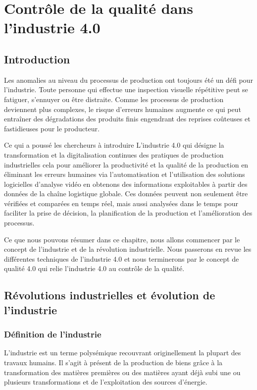 \chapter{Contrôle de la qualité dans l’industrie 4.0}
\section{Introduction}
Les anomalies au niveau du processus de production ont toujours été un défi pour l’industrie. Toute personne qui effectue une inspection visuelle répétitive peut se fatiguer, s'ennuyer ou être distraite. Comme les processus de production deviennent plus complexes, le risque d'erreurs humaines augmente ce qui peut entraîner des dégradations des produits finis engendrant des reprises coûteuses et fastidieuses pour le producteur. 

Ce qui a poussé les chercheurs à introduire L'industrie 4.0 qui désigne la transformation et la digitalisation continues des pratiques de production industrielles cela pour améliorer la productivité et la qualité de la production en éliminant les erreurs humaines via l'automatisation et l'utilisation des solutions logicielles d'analyse vidéo en obtenons des informations exploitables à partir des données de la chaîne logistique globale. Ces données peuvent non seulement être vérifiées et comparées en temps réel, mais aussi analysées dans le temps pour faciliter la prise de décision, la planification de la production et l'amélioration des processus.  

Ce que nous pouvons résumer dans ce chapitre, nous allons commencer par le concept de l'industrie et de la révolution industrielle. Nous passerons en revue les différentes techniques de l'industrie 4.0 et nous terminerons par le concept de qualité 4.0 qui relie l'industrie 4.0 au contrôle de la qualité. 
\section{Révolutions industrielles et évolution de l'industrie }
\subsection{Définition de l’industrie}
L'industrie est un terme polysémique recouvrant originellement la plupart des travaux humains. Il s'agit à présent de la production de biens grâce à la transformation des matières premières ou des matières ayant déjà subi une ou plusieurs transformations et de l'exploitation des sources d'énergie\cite{IndustrieWikipedia}.

